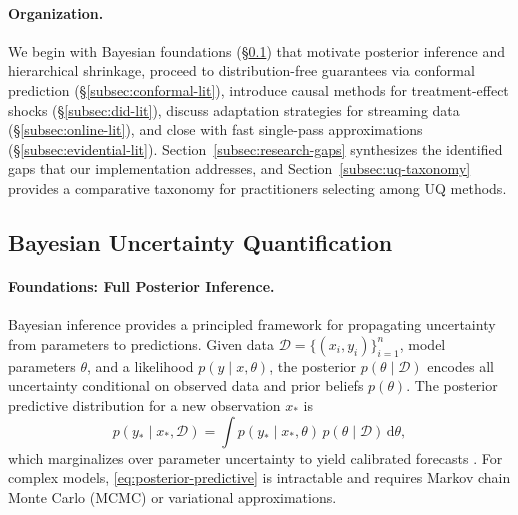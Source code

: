 \paragraph{Organization.}
We begin with Bayesian foundations (\S\ref{subsec:bayesian-uq-lit}) that motivate posterior inference and hierarchical shrinkage, proceed to distribution-free guarantees via conformal prediction (\S\ref{subsec:conformal-lit}), introduce causal methods for treatment-effect shocks (\S\ref{subsec:did-lit}), discuss adaptation strategies for streaming data (\S\ref{subsec:online-lit}), and close with fast single-pass approximations (\S\ref{subsec:evidential-lit}). Section~\ref{subsec:research-gaps} synthesizes the identified gaps that our implementation addresses, and Section~\ref{subsec:uq-taxonomy} provides a comparative taxonomy for practitioners selecting among UQ methods.

\subsection{Bayesian Uncertainty Quantification}
\label{subsec:bayesian-uq-lit}

\paragraph{Foundations: Full Posterior Inference.}
Bayesian inference provides a principled framework for propagating uncertainty from parameters to predictions. Given data $\mathcal{D}=\{(x_i, y_i)\}_{i=1}^n$, model parameters $\theta$, and a likelihood $p(y\mid x,\theta)$, the posterior $p(\theta\mid\mathcal{D})$ encodes all uncertainty conditional on observed data and prior beliefs $p(\theta)$. The posterior predictive distribution for a new observation $x_*$ is
\begin{equation}\label{eq:posterior-predictive}
p(y_* \mid x_*, \mathcal{D}) = \int p(y_* \mid x_*, \theta)\, p(\theta \mid \mathcal{D})\, \mathrm{d}\theta,
\end{equation}
which marginalizes over parameter uncertainty to yield calibrated forecasts \citep{gelman2013}. For complex models, \eqref{eq:posterior-predictive} is intractable and requires Markov chain Monte Carlo (MCMC) or variational approximations.

